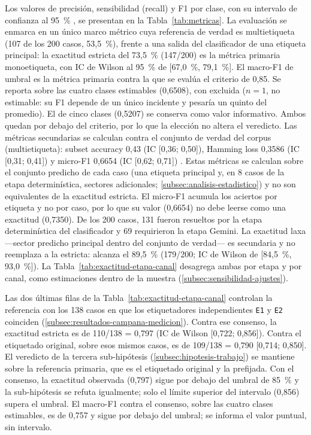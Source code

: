 Los valores de precisión, sensibilidad (recall) y F1 por clase, con su intervalo de confianza al 95~\% \parencite{Sokolova2009_performance_measures}, se presentan en la Tabla~\ref{tab:metricas}. La evaluación se enmarca en un único marco métrico cuya referencia de verdad es multietiqueta (107 de los 200 casos, 53,5~\%), frente a una salida del clasificador de una etiqueta principal: la exactitud estricta del 73,5~\% (147/200) es la métrica primaria monoetiqueta, con IC de Wilson al 95~\% de [67,0~\%, 79,1~\%]. El macro-F1 de umbral es la métrica primaria contra la que se evalúa el criterio de 0,85. Se reporta sobre las cuatro clases estimables (0,6508), con  excluida (\(n = 1\), no estimable: su F1 depende de un único incidente y pesaría un quinto del promedio). El de cinco clases (0,5207) se conserva como valor informativo. Ambos quedan por debajo del criterio, por lo que la elección no altera el veredicto. Las métricas secundarias se calculan contra el conjunto de verdad del corpus (multietiqueta): subset accuracy 0,43 (IC [0,36; 0,50]), Hamming loss 0,3586 (IC [0,31; 0,41]) y micro-F1 0,6654 (IC [0,62; 0,71]) \parencite{Tsoumakas2007_multilabel,Sokolova2009_performance_measures}. Estas métricas se calculan sobre el conjunto predicho de cada caso (una etiqueta principal y, en 8 casos de la etapa determinística, sectores adicionales; \autoref{subsec:analisis-estadistico}) y no son equivalentes de la exactitud estricta. El micro-F1 acumula los aciertos por etiqueta y no por caso, por lo que su valor (0,6654) no debe leerse como una exactitud (0,7350). De los 200 casos, 131 fueron resueltos por la etapa determinística del clasificador y 69 requirieron la etapa Gemini. La exactitud laxa ---sector predicho principal dentro del conjunto de verdad--- es secundaria y no reemplaza a la estricta: alcanza el 89,5~\% (179/200; IC de Wilson de [84,5~\%, 93,0~\%]). La Tabla~\ref{tab:exactitud-etapa-canal} desagrega ambas por etapa y por canal, como estimaciones dentro de la muestra (\autoref{subsec:sensibilidad-ajustes}).

Las dos últimas filas de la Tabla~\ref{tab:exactitud-etapa-canal} controlan la referencia con los 138 casos en que los etiquetadores independientes \texttt{E1} y \texttt{E2} coinciden (\autoref{subsec:resultados-campana-medicion}). Contra ese consenso, la exactitud estricta es de 110/138 = 0,797 (IC de Wilson [0,722; 0,856]). Contra el etiquetado original, sobre esos mismos casos, es de 109/138 = 0,790 [0,714; 0,850]. El veredicto de la tercera sub-hipótesis (\autoref{subsec:hipotesis-trabajo}) se mantiene sobre la referencia primaria, que es el etiquetado original y la prefijada. Con el consenso, la exactitud observada (0,797) sigue por debajo del umbral de 85~\% y la sub-hipótesis se refuta igualmente; solo el límite superior del intervalo (0,856) supera el umbral. El macro-F1 contra el consenso, sobre las cuatro clases estimables, es de 0,757 y sigue por debajo del umbral; se informa el valor puntual, sin intervalo.

